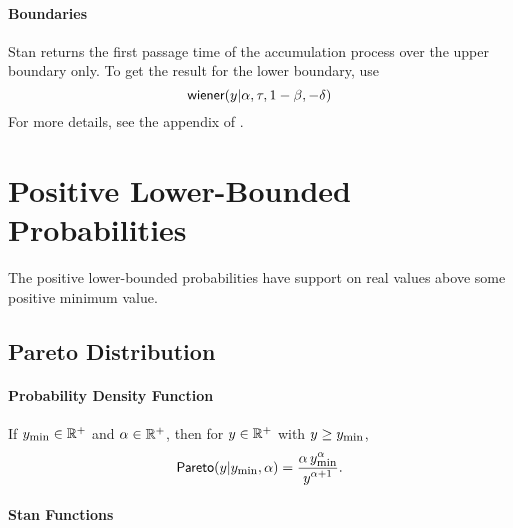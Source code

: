 \subsubsection{Boundaries}

Stan returns the first passage time of the accumulation process
over the upper boundary only. To get the result for the lower
boundary, use
%
\[
\mbox{\sf wiener}(y | \alpha, \tau, 1 - \beta, - \delta)
\]
%
For more details, see the appendix of
\citet{Vandekerckhove-Wabersich:2014}.

\chapter{Positive Lower-Bounded Probabilities}

\noindent
The positive lower-bounded probabilities have support on real values
above some positive minimum value.


\section{Pareto Distribution}

\subsubsection{Probability Density Function}

If $y_{\mbox{\footnotesize\rm min}} \in \mathbb{R}^+$ and $\alpha \in \mathbb{R}^+$, then for
$y \in \mathbb{R}^+$ with $y \geq y_{\mbox{\footnotesize\rm min}}$,
\[
\mbox{\sf Pareto}(y|y_{\mbox{\footnotesize\rm min}},\alpha)
=
\frac{\displaystyle \alpha\,y_{\mbox{\footnotesize\rm min}}^\alpha}{\displaystyle y^{\alpha+1}}.
\]


\subsubsection{Stan Functions}

